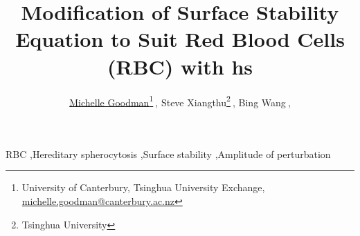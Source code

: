\documentclass[12pt, paper=a4]{elsarticle}
\begin{document}
	

	
	\begin{frontmatter}
		\title{{Modification of Surface Stability Equation to Suit Red Blood Cells (RBC) with \acf{hs} } }
		
		\author{\underline{Michelle Goodman}\footnote[1]{University of Canterbury, Tsinghua University Exchange, \href{mailto:michelle.goodman@canterbury.ac.nz}{michelle.goodman@canterbury.ac.nz}}$~$, 
			Steve Xiangthu\footnote[2]{Tsinghua University}$~$, 
			Bing Wang\footnotemark[2]$~$,}
		
			
		\begin{abstract}
			
		\end{abstract}
		
		\begin{keyword}
			RBC \sep Hereditary spherocytosis \sep Surface stability \sep Amplitude of perturbation 
			
		\end{keyword}
	\end{frontmatter}
	
	
	
	
	
	
	
	
	
	
	
	 
\end{document}
